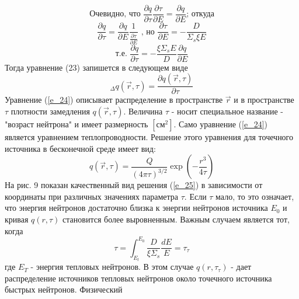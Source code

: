 \documentclass[a4paper]{article}
\begin{document}
    \begin{equation}
        \text{Очевидно, что }
        \frac{\partial q}{\partial \tau}
        \frac{\partial \tau}{\partial E} =
        \frac{\partial q}{\partial E}
        \text{; откуда}
    \end{equation}
    \begin{equation}
        \frac{\partial q}{\partial \tau} =
        \frac{\partial q}{\partial E}
        \frac{1}{\frac{\partial \tau}{\partial E}}
        \text{ , но }
        \frac{\partial \tau}{\partial E} =
        -\frac{D}{\Sigma_s\xi E}
    \end{equation}
    \begin{equation}\nonumber
        \text{т.е. }
        \frac{\partial q}{\partial \tau} =
        -\frac{\xi\Sigma_s E}{D}\frac{\partial q}{\partial E}
    \end{equation}
    Тогда уравнение (23) запишется в следующем виде
    \begin{equation}\label{e_24}\tag{24}
        {}_\Delta q(\overrightarrow{r}, \tau) =
        \frac{\partial q(\overrightarrow{r}, \tau)}{\partial \tau}
    \end{equation}
    Уравнение (\ref{e_24}) описывает распределение в пространстве
    $\overrightarrow{r}$ и в пространстве $\tau$ плотности
    замедления $q(\overrightarrow{r}, \tau)$. Величина $\tau$ - носит
    специальное название - "возраст нейтрона" и имеет размерность
    $[\text{см}^2]$. Само уравнение (\ref{e_24}) является уравнением
    теплопроводности. Решение этого уравнения для точечного источника
    в бесконечной среде имеет вид:
    \begin{equation}\label{e_25}\tag{25}
        q(\overrightarrow{r},\tau) =
        \frac{Q}{(4\pi\tau)^{3/2}}
        \exp{(-\frac{r^3}{4\tau})}
    \end{equation}
    На рис. 9 показан качественный вид решения (\ref{e_25}) в
    зависимости от координаты при различных значениях параметра $\tau$.
    Если $\tau$ мало, то это означает, что энергия нейтронов
    достаточно близка к энергии нейтронов источника $E_0$ и кривая
    $q(r,\tau)$ становится более выровненным. Важным случаем является
    тот, когда
    \begin{equation}\nonumber
        \tau=\int_{E_t}^{E_0}\frac{D}{\xi\Sigma_s}\frac{dE}{E}=
        \tau_\tau
    \end{equation}
    где $E_T$ - энергия тепловых нейтронов. В этом случае 
    $q(r, \tau_\tau)$ - дает распределение источников тепловых
    нейтронов около точечного источника быстрых нейтронов. Физический
\end{document}
